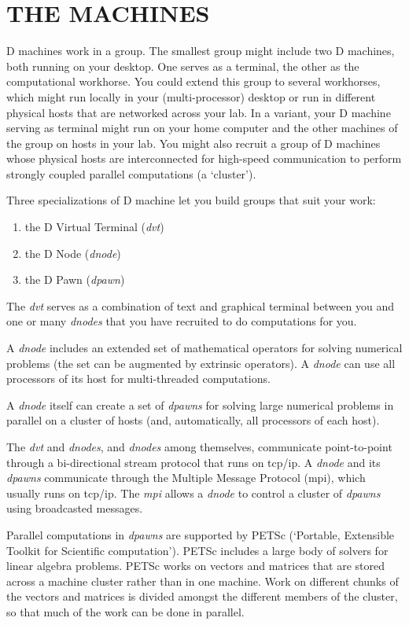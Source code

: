 \chapter{THE  MACHINES}\label{chap:cluster}

D machines work in a group. The smallest group might include two D machines, both running on your desktop. One serves as a terminal, the other as the computational workhorse. You could extend this group to several workhorses, which might run locally in your (multi-processor) desktop or run in different physical hosts that are networked across your lab. In a variant, your D machine serving as terminal might run on your home computer and the other machines of the group on hosts in your lab. You might also recruit a group of D machines whose physical hosts are interconnected for high-speed communication to perform strongly coupled parallel computations (a `cluster').

Three specializations of D machine let you build groups that suit your work:

\begin{enumerate}
\item the D Virtual Terminal (\emph{dvt})
\item the D Node (\emph{dnode})
\item the D Pawn (\emph{dpawn})
\end{enumerate}

\noindent The \emph{dvt} serves as a combination of text and graphical terminal between you and one or many \emph{dnodes} that you have recruited to do computations for you.

A \emph{dnode} includes an extended set of mathematical operators for solving numerical problems (the set can be augmented  by extrinsic operators). A \emph{dnode} can use all processors of its host for multi-threaded computations.

A \emph{dnode} itself can create a set of \emph{dpawns} for solving large numerical problems in parallel on a cluster of hosts (and, automatically, all processors of each host).

The \emph{dvt} and \emph{dnodes}, and \emph{dnodes} among themselves, communicate point-to-point through a bi-directional stream protocol that runs on tcp/ip. A \emph{dnode} and its \emph{dpawns} communicate through the Multiple Message Protocol (mpi), which usually runs on tcp/ip. The \emph{mpi} allows a \emph{dnode} to control a cluster of \emph{dpawns} using broadcasted messages.

Parallel computations in \emph{dpawns} are supported by PETSc (`Portable, Extensible Toolkit for Scientific computation'). PETSc includes a large body of solvers for linear algebra problems. PETSc works on vectors and matrices that are stored across a machine cluster rather than in one machine. Work on different chunks of the vectors and matrices is divided amongst the different members of the cluster, so that much of the work can be done in parallel.

